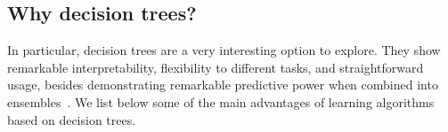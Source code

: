 \begin{itemize}
\subsection{Why decision trees?}

In particular, decision trees are a very interesting option to explore. They show remarkable interpretability, flexibility to different tasks, and straightforward usage, besides demonstrating remarkable predictive power when combined into ensembles~\cite{breiman2001random,chen2016xgboost,zhou2019deepa,grinsztajn2022why}.  %
We list below some of the main advantages of learning algorithms based on decision trees.


\end{itemize}
